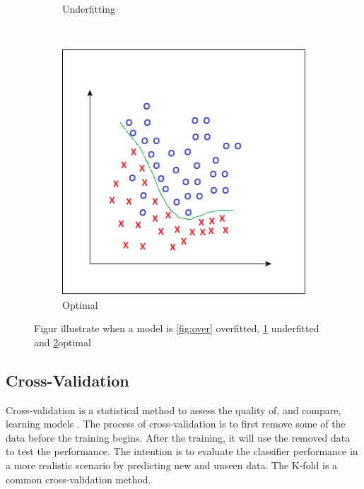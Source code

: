\documentclass[USenglish]{ifimaster}  %
\begin{document}
\begin{figure}[h]
\begin{subfigure}{.5\linewidth}
			\caption{Underfitting}
			\label{fig:under}
		\end{subfigure}\\[1ex]
		\begin{subfigure}{\linewidth}
			\centering
			\includegraphics[scale=0.43]{Figures/Finefitting}
			\caption{Optimal}
			\label{fig:optimal}
		\end{subfigure}
		\caption{Figur illustrate when a model is \ref{fig:over} overfitted, \ref{fig:under} underfitted and \ref{fig:optimal}optimal }
		\label{fig:fitting}	
	\end{figure}
	
	\FloatBarrier
	
\subsection{Cross-Validation}
Cross-validation is a statistical method to assess the quality of, and compare, learning models \cite{Refaeilzadeh2009}. The process of cross-validation is to first remove some of the data before the training begins. After the training, it will use the removed data to test the performance. The intention is to evaluate the classifier performance in a more realistic scenario by predicting new and unseen data. The K-fold is a common cross-validation method.
	
\end{document}
